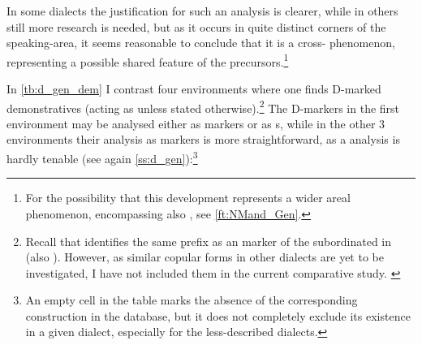 In some dialects the justification for such an analysis is clearer, while in others still more research is needed, but as it occurs in quite distinct corners of the  speaking-area, it seems reasonable to conclude that it is a cross- phenomenon, representing a possible shared feature of the  precursors.\footnote{For the possibility that this development represents a wider areal phenomenon, encompassing also \NMand, see \vref{ft:NMand_Gen}.} 


In \vref{tb:d_gen_dem} I contrast four environments where one finds D-marked demonstratives (acting as  unless stated otherwise).\footnote{Recall that \citet[90]{CohenNucleus} identifies the same \d prefix as an  marker of the subordinated  in \JZax (also ). However,  as similar copular forms in other dialects are yet to be investigated, I have not included them in the current comparative study. \label{ft:d_copula}}
The D-markers in the first environment may be analysed either as \gen* markers or as \lnk*s, while in the other 3 environments their analysis as  \gen* markers is more straightforward, as a \lnk* analysis is hardly tenable (see again \ref{ss:d_gen}):\footnote{An empty cell in the table marks the absence of the corresponding construction in the database, but it does not completely exclude its existence in a given dialect, especially for the less-described dialects.}

